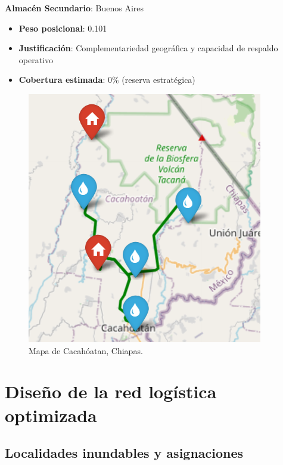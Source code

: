 \documentclass[
  spanish,
  us-letterpaper,
]{scrreprt}
\providecommand{\tightlist}{%
  \setlength{\itemsep}{0pt}\setlength{\parskip}{0pt}}
\numberwithin{equation}{chapter} %
\begin{document}
\textbf{Almacén Secundario}: Buenos Aires

\begin{itemize}
\tightlist
\item
  \textbf{Peso posicional}: 0.101
\item
  \textbf{Justificación}: Complementariedad geográfica y capacidad de
  respaldo operativo
\item
  \textbf{Cobertura estimada}: 0\% (reserva estratégica)
\end{itemize}

\begin{figure}[H]

{\centering \includegraphics[width=0.9\linewidth,height=\textheight,keepaspectratio]{chapters/almacen.png}

}

\caption{Mapa de Cacahóatan, Chiapas.}

\end{figure}%

\section{Diseño de la red logística
optimizada}\label{diseuxf1o-de-la-red-loguxedstica-optimizada}

\subsection{Localidades inundables y
asignaciones}\label{localidades-inundables-y-asignaciones}
\end{document}
